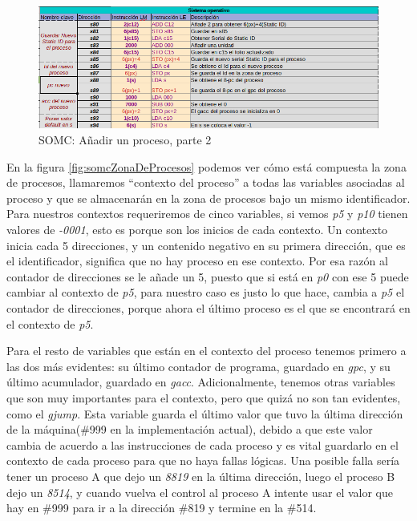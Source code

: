 \documentclass[letterpaper,12pt,oneside]{book}
\begin{document}
				\begin{figure}[h]		
			\centering
			\includegraphics[scale=0.55]{media/CARDIACC/SO_AddNewProcess2.png}
			\caption{SOMC: Añadir un proceso, parte 2}
			\label{fig:somcAddnewprocess2}
		\end{figure}
			
			En la figura \ref{fig:somcZonaDeProcesos} podemos ver cómo está compuesta la zona de procesos, llamaremos ``contexto del proceso'' a todas
			las variables asociadas al proceso y que se almacenarán en la zona de procesos bajo un mismo identificador. Para nuestros contextos
			requeriremos de cinco variables, si vemos \textit{p5} y \textit{p10} tienen valores de \textit{-0001}, esto es porque son los inicios de cada contexto.
			Un contexto inicia cada 5 direcciones, y un contenido negativo en su primera dirección, que es el identificador, significa que no hay proceso en ese
			contexto. Por esa razón al contador de direcciones se le añade un 5, puesto que si está en \textit{p0} con ese 5 puede cambiar al contexto
			de \textit{p5}, para nuestro caso es justo lo que hace, cambia a \textit{p5} el contador de direcciones, porque ahora
			el último proceso es el que se encontrará en el contexto de \textit{p5}.
   
            Para el resto de variables que están en el contexto del proceso tenemos primero a las dos más evidentes:
            su último
			contador de programa, guardado en \textit{gpc}, y su último acumulador, guardado en  \textit{gacc}. Adicionalmente, tenemos otras variables que son muy importantes para el contexto, pero que quizá no son tan evidentes, como el \textit{gjump}. Esta variable guarda el último valor que tuvo la última dirección de
			la máquina(\#999 en la implementación actual), debido a que este valor cambia de acuerdo a las instrucciones de cada proceso y es vital guardarlo en
			el contexto de cada proceso para que no haya fallas lógicas. Una posible falla sería tener un proceso A que dejo un \textit{8819} en la última dirección, luego el proceso B dejo un \textit{8514}, y
			cuando vuelva el control al proceso A intente usar el valor que hay en \#999 para ir a 
            la dirección \#819 y termine en la \#514.
   
\end{document}

